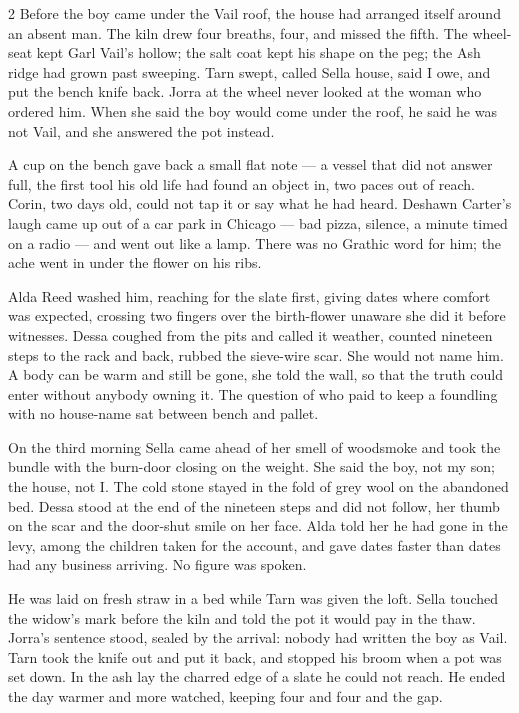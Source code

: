 \begin{CRchronicle}{2}
Before the boy came under the Vail roof, the house had arranged itself around an absent man. The kiln drew four breaths, four, and missed the fifth. The wheel-seat kept Garl Vail’s hollow; the salt coat kept his shape on the peg; the Ash ridge had grown past sweeping. Tarn swept, called Sella house, said I owe, and put the bench knife back. Jorra at the wheel never looked at the woman who ordered him. When she said the boy would come under the roof, he said he was not Vail, and she answered the pot instead.

A cup on the bench gave back a small flat note --- a vessel that did not answer full, the first tool his old life had found an object in, two paces out of reach. Corin, two days old, could not tap it or say what he had heard. Deshawn Carter’s laugh came up out of a car park in Chicago --- bad pizza, silence, a minute timed on a radio --- and went out like a lamp. There was no Grathic word for him; the ache went in under the flower on his ribs.

Alda Reed washed him, reaching for the slate first, giving dates where comfort was expected, crossing two fingers over the birth-flower unaware she did it before witnesses. Dessa coughed from the pits and called it weather, counted nineteen steps to the rack and back, rubbed the sieve-wire scar. She would not name him. A body can be warm and still be gone, she told the wall, so that the truth could enter without anybody owning it. The question of who paid to keep a foundling with no house-name sat between bench and pallet.

On the third morning Sella came ahead of her smell of woodsmoke and took the bundle with the burn-door closing on the weight. She said the boy, not my son; the house, not I. The cold stone stayed in the fold of grey wool on the abandoned bed. Dessa stood at the end of the nineteen steps and did not follow, her thumb on the scar and the door-shut smile on her face. Alda told her he had gone in the levy, among the children taken for the account, and gave dates faster than dates had any business arriving. No figure was spoken.

He was laid on fresh straw in a bed while Tarn was given the loft. Sella touched the widow’s mark before the kiln and told the pot it would pay in the thaw. Jorra’s sentence stood, sealed by the arrival: nobody had written the boy as Vail. Tarn took the knife out and put it back, and stopped his broom when a pot was set down. In the ash lay the charred edge of a slate he could not reach. He ended the day warmer and more watched, keeping four and four and the gap.
\end{CRchronicle}

